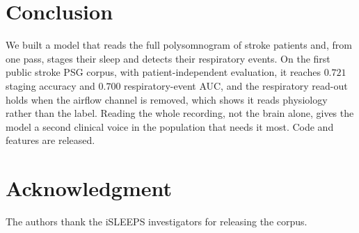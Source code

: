 \documentclass[journal]{IEEEtran}
\newcommand{\mmAcc}{0.721}   %
\newcommand{\mmAuc}{0.700}   %
\begin{document}
\section{Conclusion}
We built a model that reads the full polysomnogram of stroke patients and, from one pass,
stages their sleep and detects their respiratory events. On the first public stroke PSG corpus,
with patient-independent evaluation, it reaches $\mmAcc$ staging accuracy and $\mmAuc$
respiratory-event AUC, and the respiratory read-out holds when the airflow channel is removed,
which shows it reads physiology rather than the label. Reading the whole recording, not the
brain alone, gives the model a second clinical voice in the population that needs it most. Code
and features are released.

\section*{Acknowledgment}
The authors thank the iSLEEPS investigators for releasing the corpus.



\end{document}
